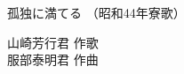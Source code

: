 \documentclass[10pt,b5j]{tarticle} %
\begin{document}
\begin{minipage}[c]{0.7\hsize} %
    \begin{center}
        {\LARGE
            孤独に満てる %
        }
        {\small 
            （昭和44年寮歌） %
        }
    \end{center}
\end{minipage}
\begin{minipage}[c]{0.3\hsize} %
    \begin{flushright} %
        山崎芳行君 作歌\\服部泰明君 作曲 %
    \end{flushright}
\end{minipage}
\end{document}
